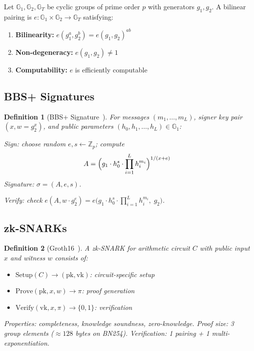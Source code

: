 \documentclass[11pt,a4paper]{article}
\newtheorem{definition}{Definition}[section]
\begin{document}
Let $\mathbb{G}_1, \mathbb{G}_2, \mathbb{G}_T$ be cyclic groups of prime
order $p$ with generators $g_1, g_2$.  A bilinear pairing is
$e : \mathbb{G}_1 \times \mathbb{G}_2 \to \mathbb{G}_T$ satisfying:

\begin{enumerate}
    \item \textbf{Bilinearity:} $e(g_1^a, g_2^b) = e(g_1, g_2)^{ab}$
    \item \textbf{Non-degeneracy:} $e(g_1, g_2) \neq 1$
    \item \textbf{Computability:} $e$ is efficiently computable
\end{enumerate}

\subsection{BBS+ Signatures}

\begin{definition}[BBS+ Signature~\cite{au2006constant}]
    For messages $(m_1, \ldots, m_L)$, signer key pair $(x, w = g_2^x)$,
    and public parameters $(h_0, h_1, \ldots, h_L) \in \mathbb{G}_1$:

    Sign: choose random $e, s \leftarrow \mathbb{Z}_p$; compute
    \[
        A = \Bigl(g_1 \cdot h_0^s \cdot \prod_{i=1}^{L} h_i^{m_i}
        \Bigr)^{1/(x+e)}
    \]
    Signature: $\sigma = (A, e, s)$.

    Verify: check
    $e(A, w \cdot g_2^e) = e\bigl(g_1 \cdot h_0^s \cdot
    \prod_{i=1}^{L} h_i^{m_i},\; g_2\bigr)$.
\end{definition}

\subsection{zk-SNARKs}

\begin{definition}[Groth16~\cite{groth2016size}]
    A zk-SNARK for arithmetic circuit $C$ with public input $x$ and
    witness $w$ consists of:
    \begin{itemize}
        \item $\mathrm{Setup}(C) \to (\mathrm{pk}, \mathrm{vk})$:
        circuit-specific setup
        \item $\mathrm{Prove}(\mathrm{pk}, x, w) \to \pi$:
        proof generation
        \item $\mathrm{Verify}(\mathrm{vk}, x, \pi) \to \{0,1\}$:
        verification
    \end{itemize}
    Properties: completeness, knowledge soundness, zero-knowledge.
    Proof size: 3 group elements ($\approx 128$ bytes on BN254).
    Verification: 1 pairing + 1 multi-exponentiation.
\end{definition}
\end{document}
